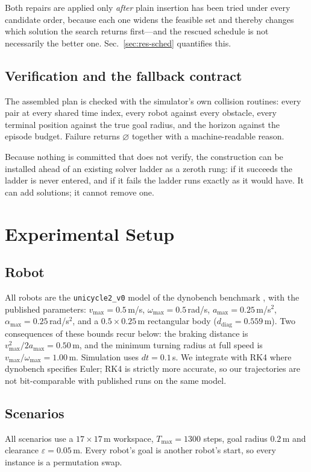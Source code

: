 \documentclass[conference]{IEEEtran}
\begin{document}
Both repairs are applied only \emph{after} plain insertion has been tried under every
candidate order, because each one widens the feasible set and thereby changes which
solution the search returns first---and the rescued schedule is not necessarily the better
one. Sec.~\ref{sec:res-sched} quantifies this.

\subsection{Verification and the fallback contract}

The assembled plan is checked with the simulator's own collision routines: every pair at
every shared time index, every robot against every obstacle, every terminal position
against the true goal radius, and the horizon against the episode budget. Failure returns
$\varnothing$ together with a machine-readable reason.

Because nothing is committed that does not verify, the construction can be installed ahead
of an existing solver ladder as a zeroth rung: if it succeeds the ladder is never entered,
and if it fails the ladder runs exactly as it would have. It can add solutions; it cannot
remove one.

\section{Experimental Setup}

\subsection{Robot}
All robots are the \texttt{unicycle2\_v0} model of the dynobench benchmark
\cite{dynobench}, with the published parameters: $v_{\max} = 0.5$\,m/s,
$\omega_{\max} = 0.5$\,rad/s, $a_{\max} = 0.25$\,m/s$^2$,
$\alpha_{\max} = 0.25$\,rad/s$^2$, and a $0.5 \times 0.25$\,m rectangular body
($d_{\mathrm{diag}} = 0.559$\,m). Two consequences of these bounds recur below: the braking
distance is $v_{\max}^2/2a_{\max} = 0.50$\,m, and the minimum turning radius at full speed
is $v_{\max}/\omega_{\max} = 1.00$\,m. Simulation uses $dt = 0.1$\,s. We integrate with
RK4 where dynobench specifies Euler; RK4 is strictly more accurate, so our trajectories are
not bit-comparable with published runs on the same model.

\subsection{Scenarios}
All scenarios use a $17 \times 17$\,m workspace, $T_{\max} = 1300$ steps, goal radius
$0.2$\,m and clearance $\varepsilon = 0.05$\,m. Every robot's goal is another robot's
start, so every instance is a permutation swap.
\end{document}
